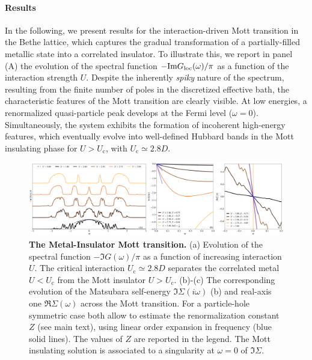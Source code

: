 \documentclass[edipack2.tex]{subfiles}
\begin{document}
\paragraph{Results}
In the following, we present results for the interaction-driven Mott 
transition in the Bethe lattice, which captures the gradual 
transformation of a partially-filled metallic state into a correlated 
insulator.
To illustrate this, we report in panel (A) the evolution of the spectral 
function $-{\rm Im}G_\mathrm{loc}(\omega)/\pi$ as a function of the 
interaction strength $U$. Despite the inherently {\it spiky} nature 
of the spectrum, resulting from the finite number of poles in the 
discretized effective bath, the characteristic features of the Mott 
transition are clearly visible. At low energies, a renormalized 
quasi-particle peak develops at the Fermi level ($\omega = 0$). 
Simultaneously, the system exhibits the formation of incoherent 
high-energy features, which eventually evolve into well-defined 
Hubbard bands in the Mott insulating phase for $U > U_\mathrm{c}$, 
with $U_\mathrm{c} \simeq 2.8D$.

\begin{figure}[t!]
  \includegraphics[width=\linewidth]{figures/figBethe.pdf}
    \caption{\label{figEx1}%
      \textbf{The Metal-Insulator Mott transition.}
      (a) Evolution of the spectral function $-\Im{G}(\omega)/\pi$ as
      a function of increasing interaction $U$. The critical
      interaction $U_\mathrm{c}\simeq 2.8D$ separates the correlated metal $U<U_\mathrm{c}$ from
      the Mott insulator $U>U_\mathrm{c}$.
      (b)-(c) The corresponding evolution of the Matsubara self-energy
      $\Im\Sigma(i\omega)$ (b) and
      real-axis one $\Re\Sigma(\omega)$ across the Mott
      transition. For a particle-hole symmetric case both allow to
      estimate the renormalization constant $Z$ (see main text), using
      linear order expansion in frequency (blue solid lines). The
      values of $Z$ are reported in the legend.
      The Mott insulating solution is associated to a singularity at
      $\omega=0$ of $\Im\Sigma$. 
        }
\end{figure}
\end{document}

